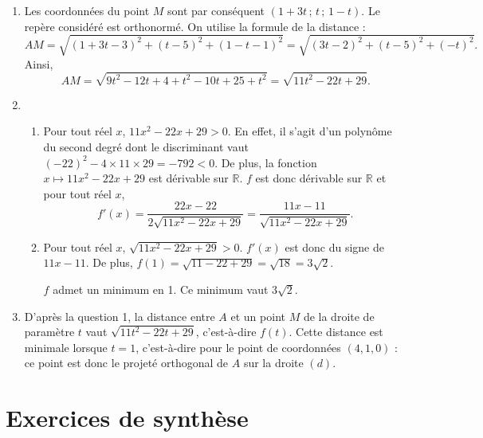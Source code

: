 \documentclass[11pt,fleqn, openany]{book} %
\begin{document}
\begin{solution}\hspace{0pt}

\begin{enumerate}
\item Les coordonnées du point $M$ sont par conséquent $(1+3t\, ;\,t\,;\,1-t)$. Le repère considéré est orthonormé. On utilise la formule de la distance :
\[ AM = \sqrt{ (1+3t-3)^2+(t-5)^2 + (1-t-1)^2 } = \sqrt{(3t-2)^2+(t-5)^2+(-t)^2}.\]
Ainsi,
\[ AM = \sqrt{9t^2-12t+4+t^2-10t+25+t^2}=\sqrt{11t^2-22t+29}.\]
\item 
\begin{enumerate}
\item Pour tout réel $x$, $11x^2-22x+29>0$. En effet, il s'agit d'un polynôme du second degré dont le discriminant vaut $(-22)^2-4 \times 11 \times 29 = -792 <0$. De plus, la fonction $x\mapsto 11x^2-22x+29$ est dérivable sur $\mathbb{R}$. $f$ est donc dérivable sur $\mathbb{R}$ et pour tout réel $x$,
\[f'(x) = \dfrac{22x-22}{2\sqrt{11x^2-22x+29}}=\dfrac{11x-11}{\sqrt{11x^2-22x+29}}.\]
\item Pour tout réel $x$, $\sqrt{11x^2-22x+29}>0$. $f'(x)$ est donc du signe de $11x-11$. De plus, $f(1)=\sqrt{11-22+29}=\sqrt{18}=3\sqrt{2}$.

\begin{center}
\end{center}

$f$ admet un minimum en 1. Ce minimum vaut $3\sqrt{2}$.
\end{enumerate}
\item D'après la question 1, la distance entre $A$ et un point $M$ de la droite de paramètre $t$ vaut $\sqrt{11t^2-22t+29}$, c'est-à-dire $f(t)$. Cette distance est minimale lorsque $t=1$, c'est-à-dire pour le point de coordonnées $(4,1,0)$ : ce point est donc le projeté orthogonal de $A$ sur la droite $(d)$.
\end{enumerate} \end{solution}



\section*{Exercices de synthèse}
\end{document}
